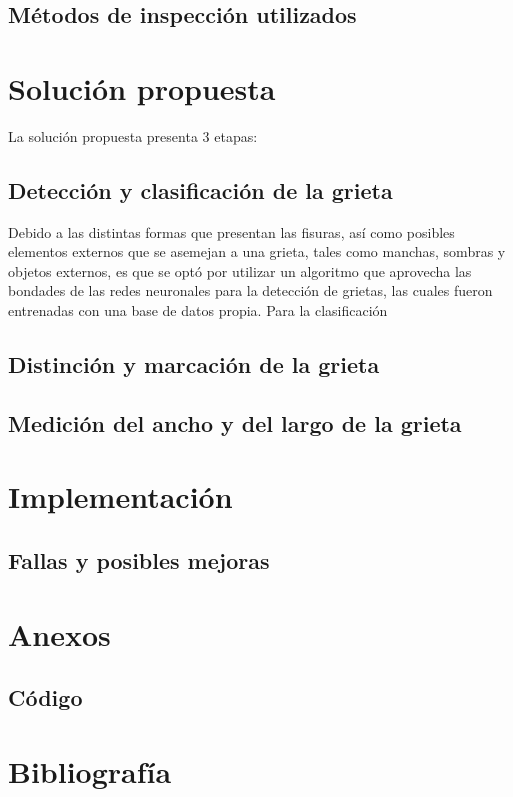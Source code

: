 \documentclass[11pt,a4paper]{article}
\begin{document}
\subsection{Métodos de inspección utilizados}



\section{Solución propuesta}

La solución propuesta presenta 3 etapas:

\subsection{Detección y clasificación de la grieta}

Debido a las distintas formas que presentan las fisuras, así como posibles elementos externos que se asemejan a una grieta, tales como manchas, sombras y objetos externos, es que se optó por utilizar un algoritmo que aprovecha las bondades de las redes neuronales para la detección de grietas, las cuales fueron entrenadas con una base de datos propia. Para la clasificación

\subsection{Distinción y marcación de la grieta}



\subsection{Medición del ancho y del largo de la grieta}

\section{Implementación}


\subsection{Fallas y posibles mejoras}



\section{Anexos}
\subsection{Código}

\section{Bibliografía}
\end{document}

